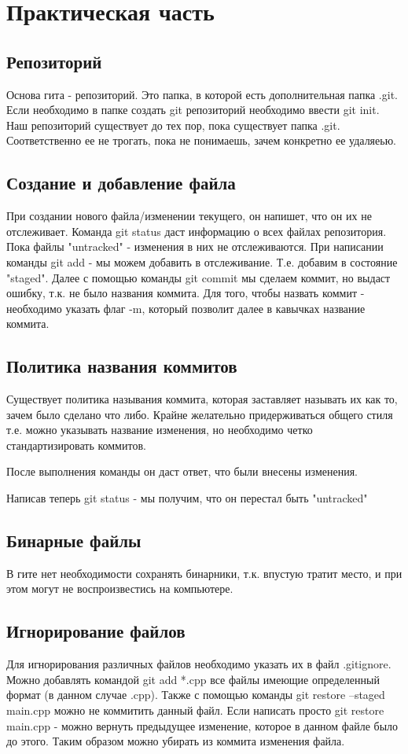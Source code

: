 \documentclass[a4paper,12pt]{article}
\begin{document}
\section{Практическая часть}
\subsection{Репозиторий}
Основа гита - репозиторий. Это папка, в которой есть дополнительная папка .git. Если необходимо в папке создать git репозиторий необходимо ввести git init. 
Наш репозиторий существует до тех пор, пока существует папка .git. Соответственно ее не трогать, пока не понимаешь, зачем конкретно ее удаляеью. 
\subsection{Создание и добавление файла}
При создании нового файла/изменении текущего, он напишет, что он их не отслеживает. Команда git status даст информацию о всех файлах репозитория. Пока файлы "untracked" -
изменения в них не отслеживаются. При написании команды git add - мы можем добавить в отслеживание. Т.е. добавим в состояние "staged". Далее с помощью команды git commit 
мы сделаем коммит, но выдаст ошибку, т.к. не было названия коммита. Для того, чтобы назвать коммит - необходимо указать флаг -m, который позволит
далее в кавычках название коммита. 
\subsection{Политика названия коммитов}
Существует политика называния коммита, которая заставляет называть их как то, зачем было сделано что либо. Крайне желательно придерживаться общего стиля
т.е. можно указывать название изменения, но необходимо четко стандартизировать коммитов. 

После выполнения команды он даст ответ, что были внесены изменения. 

Написав теперь git status - мы получим, что он перестал быть "untracked"
\subsection{Бинарные файлы}
В гите нет необходимости сохранять бинарники, т.к. впустую тратит место, и при этом могут не воспроизвестись на компьютере. 
\subsection{Игнорирование файлов}
Для игнорирования различных файлов необходимо указать их в файл .gitignore. Можно добавлять командой git add *.cpp все файлы имеющие
определенный формат (в данном случае .cpp). Также с помощью команды git restore --staged main.cpp можно не коммитить данный файл. Если написать просто git restore main.cpp - можно вернуть предыдущее изменение, которое в данном файле было до этого. Таким образом можно убирать из коммита изменения файла. 
\end{document}
